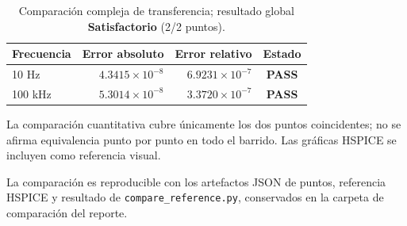 \begin{table}[H]
\centering
\begin{tabular}{lrrc}
\toprule
Frecuencia & Error absoluto & Error relativo & Estado \\
\midrule
10 Hz & $4.3415\times10^{-8}$ & $6.9231\times10^{-7}$ & \textbf{PASS} \\
100 kHz & $5.3014\times10^{-8}$ & $3.3720\times10^{-7}$ & \textbf{PASS} \\
\bottomrule
\end{tabular}
\caption{Comparación compleja de transferencia; resultado global \textbf{Satisfactorio} (2/2 puntos).}
\end{table}

La comparación cuantitativa cubre únicamente los dos puntos coincidentes; no se afirma equivalencia punto por punto en todo el barrido. Las gráficas HSPICE se incluyen como referencia visual.


La comparación es reproducible con los artefactos JSON de puntos, referencia HSPICE y resultado de \texttt{compare\_reference.py}, conservados en la carpeta de comparación del reporte.